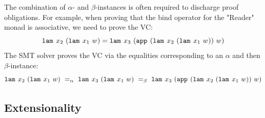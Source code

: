 %
The combination of $\alpha$- and $\beta$-instances
is often required to discharge proof obligations.
%
For example, when proving that the bind operator
for the "Reader" monad is associative, we need
to prove the VC:
%
$$\texttt{lam}^{}_{}\ {x_2}\ {(\texttt{lam}^{}_{}\ {x_1}\ {w})} =
  \texttt{lam}^{}_{}\ {x_3}\ {(\texttt{app}^{}_{}\ {(\texttt{lam}^{}_{}\ {x_2}\ {(\texttt{lam}^{}_{}\ {x_1}\ {w})})}\ {w})}$$
%
The SMT solver proves the VC via the equalities
corresponding to an $\alpha$ and then $\beta$-instance:
%
$$
\slam{x_2}{(\slam{x_1}{w})}
  \ =_{\alpha}\  \slam{x_3}{(\slam{x_1}{w})} \\
  \ =_{\beta}\  \slam{x_3}{(\smapp{(\slam{x_2}{(\slam{x_1}{w})})}{w})}
$$

\subsection{Extensionality} \label{subsec:extensionality}

